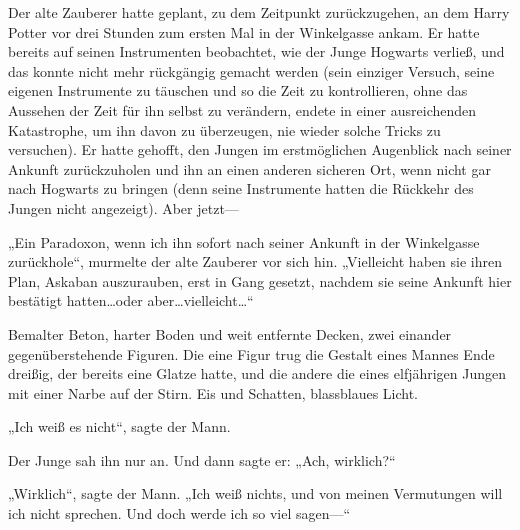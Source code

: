 Der alte Zauberer hatte geplant, zu dem Zeitpunkt zurückzugehen, an dem Harry Potter vor drei Stunden zum ersten Mal in der Winkelgasse ankam. Er hatte bereits auf seinen Instrumenten beobachtet, wie der Junge Hogwarts verließ, und das konnte nicht mehr rückgängig gemacht werden (sein einziger Versuch, seine eigenen Instrumente zu täuschen und so die Zeit zu kontrollieren, ohne das Aussehen der Zeit für ihn selbst zu verändern, endete in einer ausreichenden Katastrophe, um ihn davon zu überzeugen, nie wieder solche Tricks zu versuchen). Er hatte gehofft, den Jungen im erstmöglichen Augenblick nach seiner Ankunft zurückzuholen und ihn an einen anderen sicheren Ort, wenn nicht gar nach Hogwarts zu bringen (denn seine Instrumente hatten die Rückkehr des Jungen nicht angezeigt). Aber jetzt—

„Ein Paradoxon, wenn ich ihn sofort nach seiner Ankunft in der Winkelgasse zurückhole“, murmelte der alte Zauberer vor sich hin. „Vielleicht haben sie ihren Plan, Askaban auszurauben, erst in Gang gesetzt, nachdem sie seine Ankunft hier bestätigt hatten…oder aber…vielleicht…“

\later

Bemalter Beton, harter Boden und weit entfernte Decken, zwei einander gegenüberstehende Figuren. Die eine Figur trug die Gestalt eines Mannes Ende dreißig, der bereits eine Glatze hatte, und die andere die eines elfjährigen Jungen mit einer Narbe auf der Stirn. Eis und Schatten, blassblaues Licht.

„Ich weiß es nicht“, sagte der Mann.

Der Junge sah ihn nur an. Und dann sagte er: „Ach, wirklich?“

„Wirklich“, sagte der Mann. „Ich weiß nichts, und von meinen Vermutungen will ich nicht sprechen. Und doch werde ich so viel sagen—“


